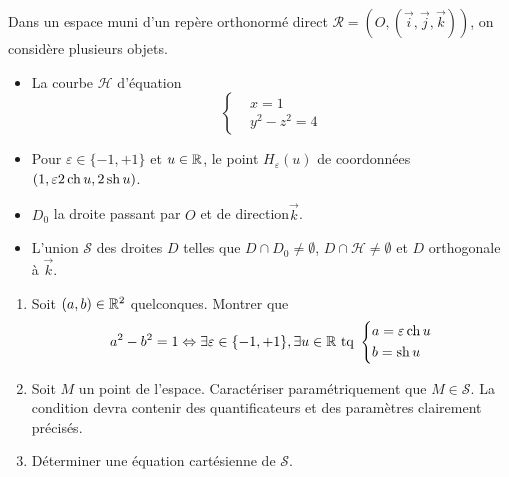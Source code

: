 Dans un espace muni d'un repère orthonormé direct $\mathcal R = (O,(\overrightarrow i ,\overrightarrow j ,\overrightarrow k))$, on considère plusieurs objets.
\begin{itemize}
 \item La courbe $\mathcal{H}$ d'équation
\begin{displaymath}
 \left\lbrace 
\begin{aligned}
 &x=1 \\ &y^2-z^2=4
\end{aligned}
\right. 
\end{displaymath}
\item Pour $\varepsilon \in \{-1,+1\}$ et $u\in \mathbb{R}$, le point $H_\varepsilon (u)$ de coordonnées $(1,\varepsilon 2\operatorname{ch} u, 2\operatorname{sh} u)$.
\item $D_0$ la droite passant par $O$ et de direction$\overrightarrow k$.
\item L'union $\mathcal{S}$ des droites $D$ telles que $D\cap D_0 \neq \emptyset$, $D\cap \mathcal{H} \neq \emptyset$ et $D$ orthogonale à $\overrightarrow k$.
\end{itemize}
\begin{enumerate}
 \item Soit $(a,b)\in\mathbb{R}^2$ quelconques. Montrer que
\begin{displaymath}
 a^2 - b^2 = 1 \Leftrightarrow
\exists \varepsilon\in\{-1,+1\}, \exists u\in \mathbb{R} \text{ tq } 
\left\lbrace 
\begin{aligned}
 &a = \varepsilon \operatorname{ch} u \\ &b = \operatorname{sh} u
\end{aligned}
\right. 
\end{displaymath}
 \item Soit $M$ un point de l'espace. Caractériser paramétriquement que $M\in \mathcal{S}$. La condition devra contenir des quantificateurs et des paramètres clairement précisés.
 \item Déterminer une équation cartésienne de $\mathcal{S}$. 
\end{enumerate}
